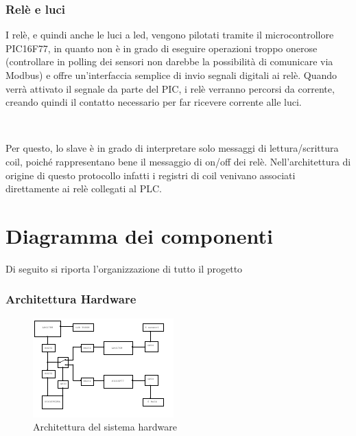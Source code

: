 \documentclass[a4paper,titlepage]{book}
\begin{document}
\subsection{Relè e luci}

I relè, e quindi anche le luci a led, vengono pilotati tramite il microcontrollore PIC16F77, in quanto non è in grado di eseguire operazioni troppo onerose (controllare in polling dei sensori non darebbe la possibilità di comunicare via Modbus) e offre un'interfaccia semplice di invio segnali digitali ai relè. Quando verrà attivato il segnale da parte del PIC, i relè verranno percorsi da corrente, creando quindi il contatto necessario per far ricevere corrente alle luci.

~

Per questo, lo slave è in grado di interpretare solo messaggi di lettura/scrittura coil, poiché rappresentano bene il messaggio di on/off dei relè. Nell'architettura di origine di questo protocollo infatti i registri di coil venivano associati direttamente ai relè collegati al PLC. 


\chapter{Diagramma dei componenti}

Di seguito si riporta l'organizzazione di tutto il progetto

\subsection{Architettura Hardware}

\begin{figure}[!h]
\centering
\includegraphics[scale=4.5]{archihard.pdf}
\caption{Architettura del sistema hardware}
\end{figure}

\newpage
\end{document}
